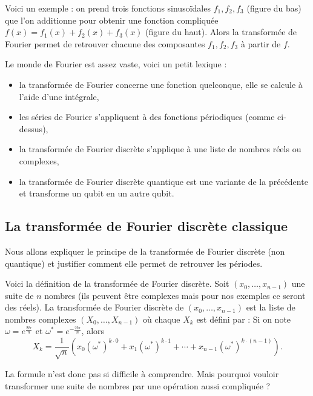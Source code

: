 \documentclass[11pt,class=report,crop=false]{standalone}
\begin{document}
Voici un exemple : on prend trois fonctions sinusoïdales $f_1, f_2, f_3$ (figure du bas) que l'on additionne pour obtenir une fonction compliquée $f(x) = f_1(x) + f_2(x) + f_3(x)$ (figure du haut). Alors la transformée de Fourier permet de retrouver chacune des composantes $f_1, f_2, f_3$ à partir de $f$.

\bigskip

Le monde de Fourier est assez vaste, voici un petit lexique :
\begin{itemize}
  \item la transformée de Fourier concerne une fonction quelconque, elle se calcule à l'aide d'une intégrale,
  \item les séries de Fourier s'appliquent à des fonctions périodiques (comme ci-dessus),
  \item la transformée de Fourier discrète s'applique à une liste de nombres réels ou complexes,
  \item la transformée de Fourier discrète quantique est une variante de la précédente et transforme un qubit en un autre qubit.
\end{itemize}



\subsection{La transformée de Fourier discrète classique}

Nous allons expliquer le principe de la transformée de Fourier discrète (non quantique) et justifier comment elle permet de retrouver les périodes.

Voici la définition de la transformée de Fourier discrète.
Soit $(x_0,\ldots,x_{n-1})$  une suite de $n$ nombres (ils peuvent être complexes mais pour nos exemples ce seront des réels).
La transformée de Fourier discrète de $(x_0,\ldots,x_{n-1})$ est la liste de nombres complexes $(X_0,\ldots, X_{n-1})$ où chaque $X_k$ est défini par :
Si on note $\omega = e^{\frac{2\ii\pi}{n}}$ et $\omega^*= e^{-\frac{2\ii\pi}{n}}$,
alors
$$X_k = \frac{1}{\sqrt n} \left( x_0(\omega^*)^{k\cdot 0} + x_1(\omega^*)^{k\cdot 1} +
\cdots +  x_{n-1}(\omega^*)^{k \cdot (n-1)}\right).$$

La formule n'est donc pas si difficile à comprendre.  Mais pourquoi vouloir transformer une suite de nombres par une opération aussi compliquée ?
\end{document}

